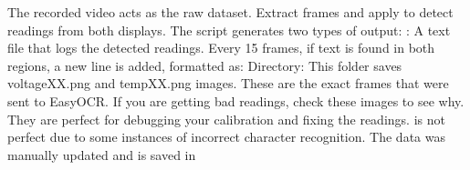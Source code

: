 \markdownRendererOlEndTight \markdownRendererInterblockSeparator
{}\markdownRendererUlBeginTight
\markdownRendererUlItem The recorded video acts as the raw dataset. \markdownRendererUlItemEnd 
\markdownRendererUlItem Extract frames and apply  to detect readings from both displays. \markdownRendererUlItemEnd 
\markdownRendererUlEndTight \markdownRendererInterblockSeparator
{}
\markdownRendererSectionEnd \markdownRendererSectionBegin
{}\markdownRendererInterblockSeparator
{}The script generates two types of output:\markdownRendererInterblockSeparator
{}\markdownRendererUlBegin
\markdownRendererUlItem {}: A text file that logs the detected readings. Every 15 frames, if text is found in both regions, a new line is added, formatted as: \markdownRendererUlItemEnd 
\markdownRendererUlItem {} Directory: This folder saves voltageXX.png and tempXX.png images. These are the exact frames that were sent to EasyOCR. If you are getting bad readings, check these images to see why. They are perfect for debugging your calibration and fixing the readings.\markdownRendererUlItemEnd 
\markdownRendererUlEnd \markdownRendererInterblockSeparator
{} is not perfect due to some instances of incorrect character recognition. The data was manually updated and is saved in 
\markdownRendererSectionEnd 
\markdownRendererSectionEnd \markdownRendererDocumentEnd